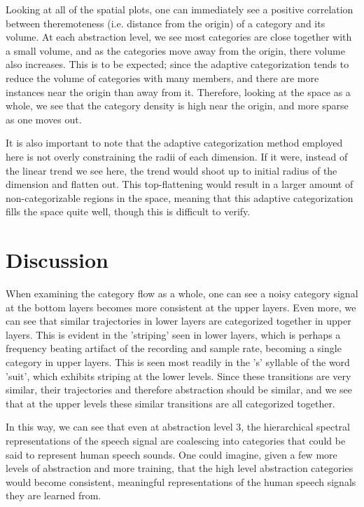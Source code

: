 \documentclass[runningheads]{llncs}
\begin{document}

Looking at all of the spatial plots, one can immediately see a positive correlation between theremoteness (i.e. distance from the origin) of a category and its volume.  At each abstraction level, we see most categories are close together with a small volume, and as the categories move away from the origin, there volume also increases.  This is to be expected; since the adaptive categorization tends to reduce the volume of categories with many members, and there are more instances near the origin than away from it.  Therefore, looking at the space as a whole, we see that the category density is high near the origin, and more sparse as one moves out.

It is also important to note that the adaptive categorization method employed here is not overly constraining the radii of each dimension.  If it were, instead of the linear trend we see here, the trend would shoot up to initial radius of the dimension and flatten out.  This top-flattening would result in a larger amount of non-categorizable regions in the space, meaning that this adaptive categorization fills the space quite well, though this is difficult to verify.


\section{Discussion}

When examining the category flow as a whole, one can see a noisy category signal at the bottom layers becomes more consistent at the upper layers.  Even more, we can see that similar trajectories in lower layers are categorized together in upper layers.  This is evident in the 'striping' seen in lower layers, which is perhaps a frequency beating artifact of the recording and sample rate, becoming a single category in upper layers.  This is seen most readily in the 's' syllable of the word 'suit', which exhibits striping at the lower levels.  Since these transitions are very similar, their trajectories and therefore abstraction should be similar, and we see that at the upper levels these similar transitions are all categorized together.

In this way, we can see that even at abstraction level 3, the hierarchical spectral representations of the speech signal are coalescing into categories that could be said to represent human speech sounds.  One could imagine, given a few more levels of abstraction and more training, that the high level abstraction categories would become consistent, meaningful representations of the human speech signals they are learned from.
\end{document}
